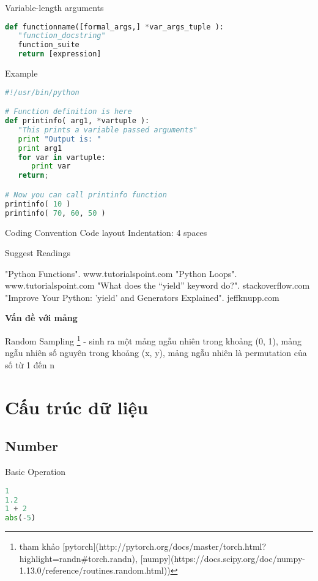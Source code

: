 Variable-length arguments

\begin{lstlisting}[language=Python]
def functionname([formal_args,] *var_args_tuple ):
   "function_docstring"
   function_suite
   return [expression]
\end{lstlisting}

Example

\begin{lstlisting}[language=Python]
#!/usr/bin/python

# Function definition is here
def printinfo( arg1, *vartuple ):
   "This prints a variable passed arguments"
   print "Output is: "
   print arg1
   for var in vartuple:
      print var
   return;

# Now you can call printinfo function
printinfo( 10 )
printinfo( 70, 60, 50 )
\end{lstlisting}

Coding Convention
Code layout
Indentation: 4 spaces

Suggest Readings

"Python Functions". www.tutorialspoint.com
"Python Loops". www.tutorialspoint.com
"What does the “yield” keyword do?". stackoverflow.com
"Improve Your Python: 'yield' and Generators Explained". jeffknupp.com

\textbf{Vấn đề với mảng}

\begin{item}
  \item Random Sampling \footnote{tham khảo [pytorch](http://pytorch.org/docs/master/torch.html?highlight=randn#torch.randn), [numpy](https://docs.scipy.org/doc/numpy-1.13.0/reference/routines.random.html))} - sinh ra một mảng ngẫu nhiên trong khoảng (0, 1), mảng ngẫu nhiên số nguyên trong khoảng (x, y), mảng ngẫu nhiên là permutation của số từ 1 đến n
\end{item}

\section{Cấu trúc dữ liệu}

\subsection{Number}

Basic Operation

\begin{lstlisting}[language=Python]
1
1.2
1 + 2
abs(-5)
\end{lstlisting}

